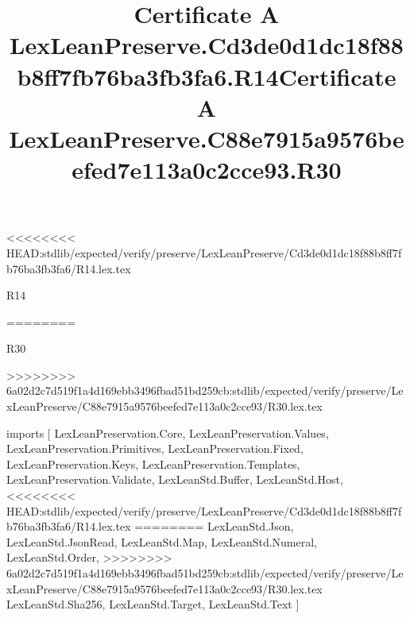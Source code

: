<<<<<<<< HEAD:stdlib/expected/verify/preserve/LexLeanPreserve/Cd3de0d1dc18f88b8ff7fb76ba3fb3fa6/R14.lex.tex
\begin{lexlean}{R14}
\title{Certificate A LexLeanPreserve.Cd3de0d1dc18f88b8ff7fb76ba3fb3fa6.R14}
========
\begin{lexlean}{R30}
\title{Certificate A LexLeanPreserve.C88e7915a9576beefed7e113a0c2cce93.R30}
>>>>>>>> 6a02d2c7d519f1a4d169ebb3496fbad51bd259cb:stdlib/expected/verify/preserve/LexLeanPreserve/C88e7915a9576beefed7e113a0c2cce93/R30.lex.tex
\begin{coremodule}
imports [
  LexLeanPreservation.Core,
  LexLeanPreservation.Values,
  LexLeanPreservation.Primitives,
  LexLeanPreservation.Fixed,
  LexLeanPreservation.Keys,
  LexLeanPreservation.Templates,
  LexLeanPreservation.Validate,
  LexLeanStd.Buffer,
  LexLeanStd.Host,
<<<<<<<< HEAD:stdlib/expected/verify/preserve/LexLeanPreserve/Cd3de0d1dc18f88b8ff7fb76ba3fb3fa6/R14.lex.tex
========
  LexLeanStd.Json,
  LexLeanStd.JsonRead,
  LexLeanStd.Map,
  LexLeanStd.Numeral,
  LexLeanStd.Order,
>>>>>>>> 6a02d2c7d519f1a4d169ebb3496fbad51bd259cb:stdlib/expected/verify/preserve/LexLeanPreserve/C88e7915a9576beefed7e113a0c2cce93/R30.lex.tex
  LexLeanStd.Sha256,
  LexLeanStd.Target,
  LexLeanStd.Text
]


\end{coremodule}
\end{lexlean}
\end{lexlean}
